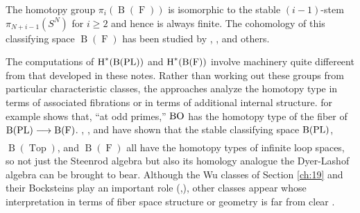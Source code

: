 \documentclass[../main]{subfiles}
\begin{document}
The homotopy group $\pi_i(\operatorname{B}(\operatorname{F}))$ is isomorphic to the stable $(i-1)$-stem $\pi_{N+i-1}(S^N)$ for $i \geq 2$ and hence is always finite. The cohomology of this classifying space $\operatorname{B}(\operatorname{F})$ has been studied by \cite{milgram}, \cite{may2006geometry}, and others.

The computations of $\operatorname{H}^\ast(\operatorname{B}(\operatorname{PL}))$ and $\operatorname{H}^\ast(\operatorname{B}(\operatorname{F}))$ involve machinery quite differeent from that developed in these notes. Rather than working out these groups from particular characteristic classes, the approaches analyze the homotopy type in terms of associated fibrations or in terms of additional internal structure. \cite{sullivan_2006} for example shows that, ``at odd primes,'' $\operatorname{BO}$ has the homotopy type of the fiber of $\operatorname{B}(\PL) \varrightarrow{} \operatorname{B}(\operatorname{F})$. \cite{boardman1973}, \cite{may2006geometry}, and \cite{SEGAL1974293} have shown that the stable classifying space $\operatorname{B}(\operatorname{PL})$, $\operatorname{B}(\operatorname{Top})$, and $\operatorname{B}(\operatorname{F})$ all have the homotopy types of infinite loop spaces, so not just the Steenrod algebra but also its homology analogue the Dyer-Lashof algebra can be brought to bear. Although the Wu classes of Section \ref{ch:19} and their Bocksteins play an important role (\cite{milnor1968},\cite{stasheff1968}), other classes appear whose interpretation in terms of fiber space structure or geometry is far from clear \cite{Ravenel1972}.
\end{document}
